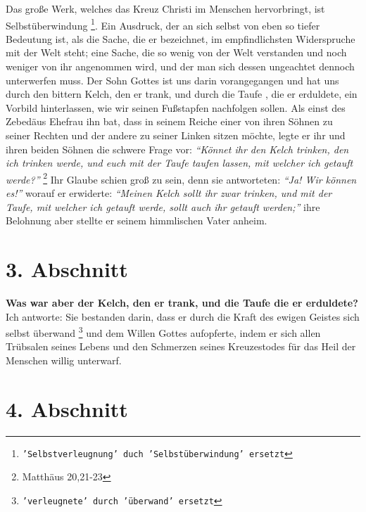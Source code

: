 Das große Werk, welches das Kreuz Christi im Menschen hervorbringt, ist
Selbstüberwindung \footnote{\texttt{'Selbstverleugnung' duch 'Selbstüberwindung'
ersetzt}}. Ein Ausdruck, der an sich selbst von eben so tiefer Bedeutung
ist, als die Sache, die er bezeichnet, im empfindlichsten Widerspruche mit der
Welt steht; eine Sache, die so wenig von der Welt verstanden und noch weniger
von ihr angenommen wird, und der man sich dessen ungeachtet dennoch unterwerfen
muss. Der Sohn Gottes ist uns darin vorangegangen und hat uns durch den bittern
Kelch, den er trank, und durch die Taufe , die er erduldete, ein
Vorbild
hinterlassen, wie wir seinen Fußstapfen nachfolgen sollen. Als einst des
Zebedäus Ehefrau  ihn bat, dass in seinem
Reiche einer von ihren Söhnen zu
seiner Rechten und der andere zu seiner Linken sitzen möchte, legte er ihr und
ihren beiden Söhnen die schwere Frage vor:
\textit{"`Könnet ihr den Kelch trinken, den
ich trinken werde, und euch mit der Taufe taufen lassen, mit welcher ich
getauft werde?"'}
\footnote{Matthäus  20,21-23}
Ihr Glaube schien groß zu sein, denn
sie antworteten:\textit{ "`Ja! Wir können es!"'} worauf er erwiderte:
  \textit{"`Meinen Kelch
sollt ihr zwar trinken, und mit der Taufe, mit welcher ich getauft werde, sollt
auch ihr getauft werden;"'} ihre Belohnung aber stellte er seinem himmlischen
Vater anheim.

\section{3. Abschnitt} \label{kap4_ab3}

 
\textbf{Was war aber der Kelch, den er trank, und die Taufe die er erduldete?}
Ich
antworte: Sie bestanden darin, dass er durch die Kraft des ewigen Geistes sich
selbst überwand \footnote{\texttt{'verleugnete' durch 'überwand' ersetzt}} und dem
Willen Gottes aufopferte, indem er sich allen
Trübsalen seines Lebens und den Schmerzen seines Kreuzestodes für das Heil der
Menschen willig unterwarf.

\section{4. Abschnitt} \label{kap4_ab4}

